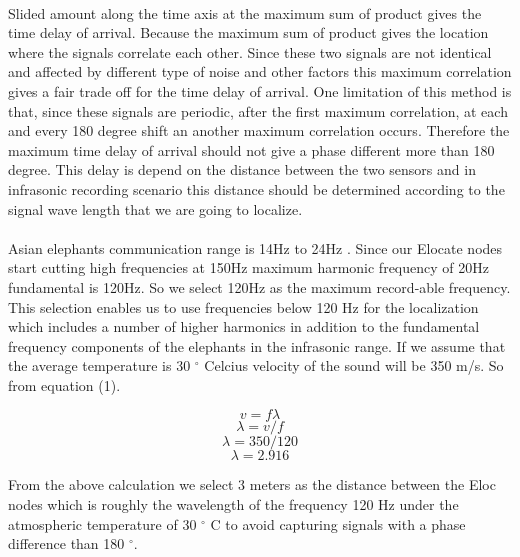 \documentclass[12pt]{article}
\numberwithin{figure}{section}
\numberwithin{table}{section}
\begin{document}
\paragraph{}
Slided amount along the time axis at the maximum sum of product gives the time delay of arrival. Because the maximum sum of product gives the location where the signals correlate each other. Since these two signals are not identical and affected by different type of noise and other factors this maximum correlation gives a fair trade off for the time delay of arrival. One limitation of this method is that, since these signals are periodic, after the first maximum correlation, at each and every 180 degree shift an another maximum correlation occurs. Therefore the maximum time delay of arrival should not give a phase different more than 180 degree. This delay is depend on the distance between the two sensors and in infrasonic recording scenario this distance should be determined according to the signal wave length that we are going to localize. 

\paragraph{}
Asian elephants communication range is 14Hz to 24Hz \cite{2}. Since our Elocate nodes start cutting high frequencies at 150Hz maximum harmonic frequency of 20Hz fundamental is 120Hz. So we select 120Hz as the maximum record-able frequency. This selection enables us to use frequencies below 120 Hz for the localization which includes a number of higher harmonics in addition to the fundamental frequency components of the elephants in the infrasonic range. If we assume that the average temperature is 30 $^{\circ}$ Celcius velocity of the sound will be 350 m/s. So from equation (1).

\begin{equation}
v=f\lambda
\end{equation}
\begin{equation}
\lambda=v/f
\end{equation}
\begin{equation}
\lambda=350/120
\end{equation}
\begin{equation}
\lambda=2.916
\end{equation}

From the above calculation we select 3 meters as the distance between the Eloc nodes which is roughly the wavelength of the frequency 120 Hz under the atmospheric temperature of 30 $^{\circ}$ C to avoid capturing signals with a phase difference than 180 $^{\circ}$.
\end{document}
